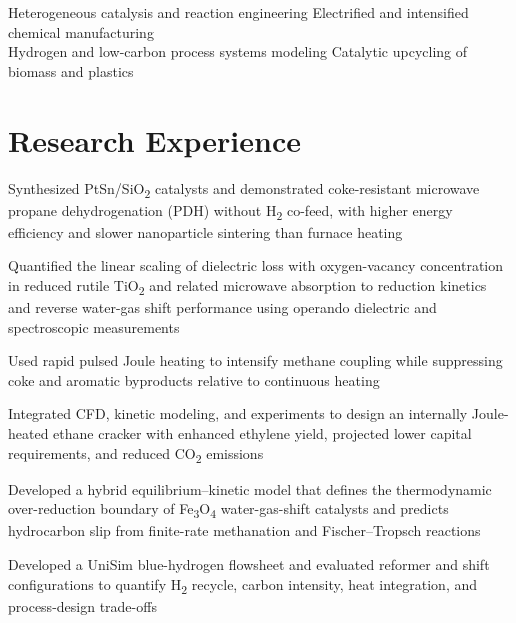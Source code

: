 Heterogeneous catalysis and reaction engineering \textbar{} Electrified and intensified chemical manufacturing\\
Hydrogen and low-carbon process systems modeling \textbar{} Catalytic upcycling of biomass and plastics

\section{Research Experience}


\begin{cvbullets}
  \item Synthesized PtSn/SiO\textsubscript{2} catalysts and demonstrated coke-resistant
        microwave propane dehydrogenation (PDH) without H\textsubscript{2} co-feed, with
        higher energy efficiency and slower nanoparticle sintering than furnace heating
  \item Quantified the linear scaling of dielectric loss with oxygen-vacancy concentration
        in reduced rutile TiO\textsubscript{2} and related microwave absorption to reduction
        kinetics and reverse water-gas shift performance using operando dielectric and
        spectroscopic measurements
  \item Used rapid pulsed Joule heating to intensify methane coupling while suppressing coke
        and aromatic byproducts relative to continuous heating
  \item Integrated CFD, kinetic modeling, and experiments to design an internally
        Joule-heated ethane cracker with enhanced ethylene yield, projected lower capital
        requirements, and reduced CO\textsubscript{2} emissions
\end{cvbullets}

\begin{cvbullets}
  \item Developed a hybrid equilibrium--kinetic model that defines the thermodynamic
        over-reduction boundary of Fe\textsubscript{3}O\textsubscript{4} water-gas-shift
        catalysts and predicts hydrocarbon slip from finite-rate methanation and
        Fischer--Tropsch reactions
  \item Developed a UniSim blue-hydrogen flowsheet and evaluated reformer and shift
        configurations to quantify H\textsubscript{2} recycle, carbon intensity, heat
        integration, and process-design trade-offs
\end{cvbullets}

